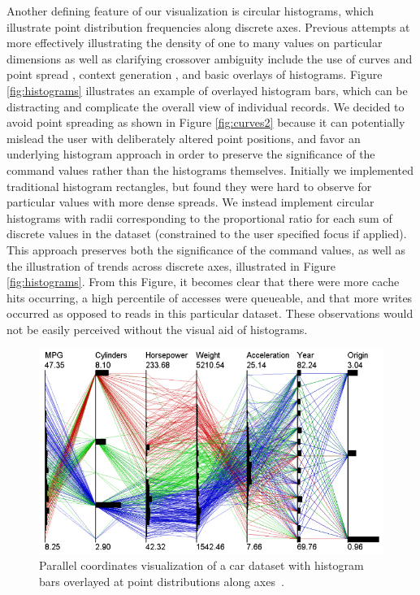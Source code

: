 \documentclass[12pt]{ucthesis}
\begin{document}
Another defining feature of our visualization is circular histograms, which illustrate point distribution frequencies along discrete axes. Previous attempts at more effectively illustrating the density of one to many values on particular dimensions as well as clarifying crossover ambiguity include the use of curves and point spread \cite{Graham:2003:UCE}, context generation \cite{novotny:2006:OPFC}, and basic overlays of histograms. Figure \ref{fig:histograms} illustrates an example of overlayed histogram bars, which can be distracting and complicate the overall view of individual records. We decided to avoid point spreading as shown in Figure \ref{fig:curves2} because it can potentially mislead the user with deliberately altered point positions, and favor an underlying histogram approach in order to preserve the significance of the command values rather than the histograms themselves. Initially we implemented traditional histogram rectangles, but found they were hard to observe for particular values with more dense spreads. We instead implement circular histograms with radii corresponding to the proportional ratio for each sum of discrete values in the dataset (constrained to the user specified focus if applied). This approach preserves both the significance of the command values, as well as the illustration of trends across discrete axes, illustrated in Figure \ref{fig:histograms}. From this Figure, it becomes clear that there were more cache hits occurring, a high percentile of accesses were queueable, and that more writes occurred as opposed to reads in this particular dataset. These observations would not be easily perceived without the visual aid of histograms.

\begin{figure}[h!]
 \centering
 \includegraphics[width=\textwidth]{images/histograms.jpg}
 \caption[Parallel coordinates visualization with histogram bars overlayed.]{Parallel coordinates visualization of a car dataset with histogram bars overlayed at point distributions along axes~\cite{McDonnell_Mueller_2008}.}
 \label{fig:histograms_ex}
\end{figure}
\end{document}
